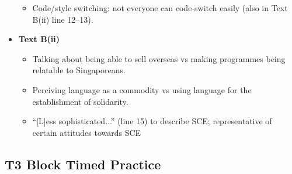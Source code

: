 \documentclass[../main.tex]{subfiles}
\begin{document}
\begin{itemize}
\begin{itemize}
                \item Code/style switching: not everyone can code-switch easily (also in Text B(ii) line 12--13).
            \end{itemize}
            \item \textbf{Text B(ii)} \begin{itemize}
                \item Talking about being able to sell overseas vs making programmes being relatable to Singaporeans.
                \item Perciving language as a commodity vs using language for the establishment of solidarity.
                \item ``[L]ess sophisticated...'' (line 15) to describe SCE; representative of certain attitudes towards SCE
            \end{itemize}
        \end{itemize}
		
		\subsection*{T3 Block Timed Practice}
\end{document}
